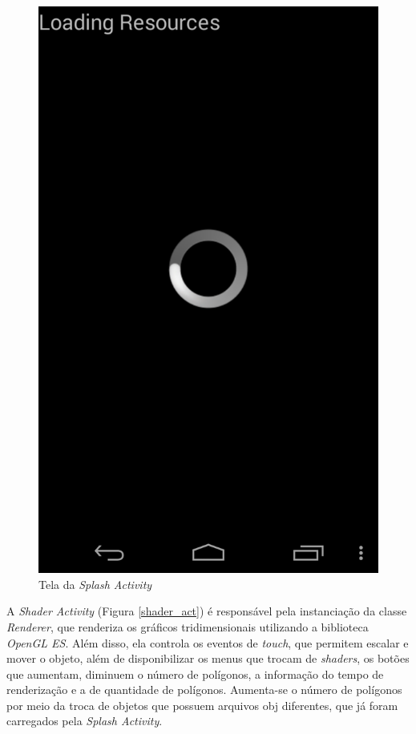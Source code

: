 	\begin{figure}[h]
	\centering
		\includegraphics[keepaspectratio=true,scale=0.2]{figuras/splash_act.png}
	\caption{Tela da \textit{Splash Activity}}
	\label{splash_act}
	\end{figure}

	A \textit{Shader Activity} (Figura  \ref{shader_act}) é responsável pela  instanciação da classe \textit{Renderer}, que renderiza os gráficos tridimensionais utilizando a biblioteca \textit{OpenGL ES}. Além disso, ela controla os eventos de \textit{touch}, que permitem escalar e mover o objeto, além de disponibilizar os menus que trocam de \textit{shaders}, os botões que aumentam, diminuem o número de polígonos, a informação do tempo de renderização e a de quantidade de polígonos. Aumenta-se o número de polígonos por meio da troca de objetos que possuem arquivos obj diferentes, que já foram carregados pela \textit{Splash Activity}. 

